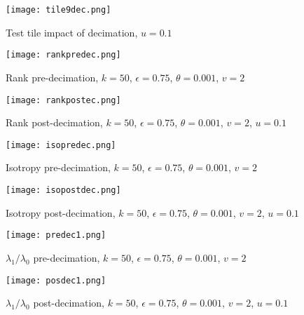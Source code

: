 \documentclass[a4paper,11pt,twoside]{article}
\theoremstyle{definition}
\theoremstyle{remark}
\begin{document}
\begin{figure}[!h]
  \caption{Test tile impact of decimation, $u=0.1$}
  \centering
    \texttt{[image: tile9dec.png]}
    \label{tile9dec}
\end{figure}
\newpage
\begin{figure}[!h]
  \caption{Rank pre-decimation, $k = 50$, $\epsilon = 0.75$, $\theta = 0.001$, $v = 2$}
  \centering
    \texttt{[image: rankpredec.png]}
    \label{rprd}
\end{figure}

\begin{figure}[!h]
  \caption{Rank post-decimation, $k = 50$, $\epsilon = 0.75$, $\theta = 0.001$, $v = 2$, $u=0.1$}
  \centering
    \texttt{[image: rankpostec.png]}
    \label{rpsd}
\end{figure}
\newpage
\begin{figure}[!h]
  \caption{Isotropy pre-decimation, $k = 50$, $\epsilon = 0.75$, $\theta = 0.001$, $v = 2$}
  \centering
    \texttt{[image: isopredec.png]}
    \label{oprd}
\end{figure}

\begin{figure}[!h]
  \caption{Isotropy post-decimation, $k = 50$, $\epsilon = 0.75$, $\theta = 0.001$, $v = 2$, $u=0.1$}
  \centering
    \texttt{[image: isopostdec.png]}
    \label{opsd}
\end{figure}
\newpage
\begin{figure}[!h]
  \caption{$\lambda_1/\lambda_0$ pre-decimation, $k = 50$, $\epsilon = 0.75$, $\theta = 0.001$, $v = 2$}
  \centering
    \texttt{[image: predec1.png]}
    \label{predec1}
\end{figure}

\begin{figure}[!h]
  \caption{$\lambda_1/\lambda_0$ post-decimation, $k = 50$, $\epsilon = 0.75$, $\theta = 0.001$, $v = 2$, $u=0.1$}
  \centering
    \texttt{[image: posdec1.png]}
    \label{posdec1}
\end{figure}
\newpage
\end{document}
